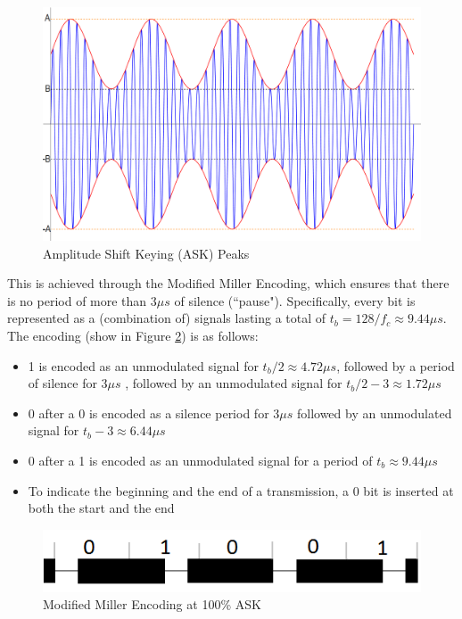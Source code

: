 \documentclass[fleqn,10pt]{SelfArx} %
\newcommand{\ms}{\ensuremath{\mu s} }
\begin{document}
\begin{figure}[tp]
  \includegraphics[width=\linewidth]{img/ask}
  \caption{Amplitude Shift Keying (ASK) Peaks}
  \label{fig:ask}
\end{figure}

This is achieved through the Modified Miller Encoding, which ensures that there is no period of more than 3\ms of silence (``pause"). Specifically, every bit is represented as a (combination of) signals lasting a total of $t_b=128/f_c\approx9.44\ms$. The encoding (show in Figure \ref{fig:miller}) is as follows:
\begin{itemize}[noitemsep] 
\item 1 is encoded as an unmodulated signal for $t_b/2\approx 4.72 \ms$, followed by a period of silence for 3\ms, followed by an unmodulated signal for $t_b/2-3\approx 1.72\ms$
\item 0 after a 0 is encoded as a silence period for 3\ms followed by an unmodulated signal for $t_b-3\approx 6.44\ms$
\item 0 after a 1 is encoded as an unmodulated signal for a period of $t_b\approx9.44\ms$
\item To indicate the beginning and the end of a transmission, a 0 bit is inserted at both the start and the end
\end{itemize}

\begin{figure}[tp]
  \includegraphics[width=\linewidth]{img/miller}
  \caption{Modified Miller Encoding at 100\% ASK}
  \label{fig:miller}
\end{figure}
\end{document}
